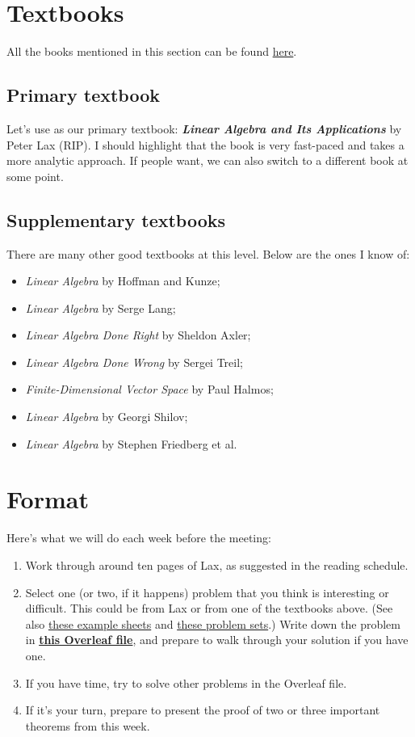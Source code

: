 \documentclass{article}
\begin{document}
\section{Textbooks}
All the books mentioned in this section can be found \href{https://drive.google.com/drive/folders/1chb49hv65hB8ZXcne0Ljfh3viO_SdOmW?usp=drive_link}{here}.

\subsection{Primary textbook}
Let's use as our primary textbook: \textbf{\emph{Linear Algebra and Its Applications}} by Peter Lax (RIP). I should highlight that the book is very fast-paced and takes a more analytic approach. If people want, we can also switch to a different book at some point.

\subsection{Supplementary textbooks}
There are many other good textbooks at this level. Below are the ones I know of:
\begin{itemize}
    \item \textit{Linear Algebra} by Hoffman and Kunze;
    \item \textit{Linear Algebra} by Serge Lang;
    \item \textit{Linear Algebra Done Right} by Sheldon Axler;
    \item \textit{Linear Algebra Done Wrong} by Sergei Treil;
    \item \textit{Finite-Dimensional Vector Space} by Paul Halmos;
    \item \textit{Linear Algebra} by Georgi Shilov;
    \item \textit{Linear Algebra} by Stephen Friedberg et al.
\end{itemize}

\section{Format}
Here's what we will do each week before the meeting:
\begin{enumerate}
    \item Work through around ten pages of Lax, as suggested in the reading schedule.
    \item Select one (or two, if it happens) problem that you think is interesting or difficult. This could be from Lax or from one of the textbooks above. (See also \href{https://www.dpmms.cam.ac.uk/study/IB/LinearAlgebra/}{these example sheets} and \href{https://ocw.mit.edu/courses/18-700-linear-algebra-fall-2013/pages/assignments/}{these problem sets}.) Write down the problem in \href{https://www.overleaf.com/8251467867kkqxyvzcmndp#f019d2}{\textbf{this Overleaf file}}, and prepare to walk through your solution if you have one.
    \item If you have time, try to solve other problems in the Overleaf file.
    \item If it's your turn, prepare to present the proof of two or three important theorems from this week.
\end{enumerate}
\end{document}
